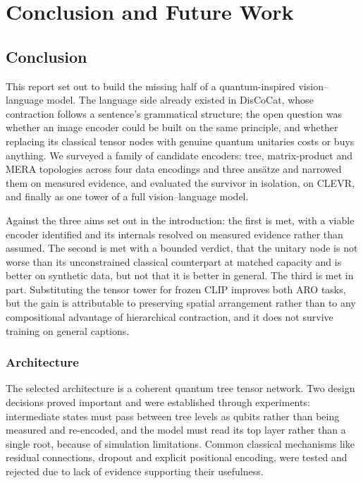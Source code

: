 \documentclass[12pt, a4paper, oneside]{report}
\begin{document}
\chapter{Conclusion and Future Work}

\section{Conclusion}

This report set out to build the missing half of a quantum-inspired vision--language model. The language side already existed in DisCoCat, whose contraction follows a sentence's grammatical structure; the open question was whether an image encoder could be built on the same principle, and whether replacing its classical tensor nodes with genuine quantum unitaries costs or buys anything. We surveyed a family of candidate encoders: tree, matrix-product and MERA topologies across four data encodings and three ans\"{a}tze and narrowed them on measured evidence, and evaluated the survivor in isolation, on CLEVR, and finally as one tower of a full vision--language model.

Against the three aims set out in the introduction: the first is met, with a viable encoder identified and its internals resolved on measured evidence rather than assumed. The second is met with a bounded verdict, that the unitary node is not worse than its unconstrained classical counterpart at matched capacity and is better on synthetic data, but not that it is better in general. The third is met in part. Substituting the tensor tower for frozen CLIP improves both ARO tasks, but the gain is attributable to preserving spatial arrangement rather than to any compositional advantage of hierarchical contraction, and it does not survive training on general captions.

\subsection{Architecture}

The selected architecture is a coherent quantum tree tensor network. Two design decisions proved important and were established through experiments: intermediate states must pass between tree levels as qubits rather than being measured and re-encoded, and the model must read its top layer rather than a single root, because of simulation limitations. Common classical mechanisms like residual connections, dropout and explicit positional encoding, were tested and rejected due to lack of evidence supporting their usefulness.
\end{document}
